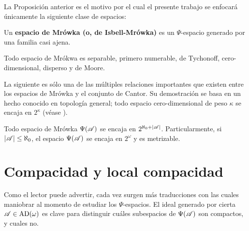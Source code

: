 La Proposición anterior es el motivo por el cual el presente trabajo se enfocará únicamente la siguiente clase de espacios:

\begin{definicion}
	Un \textbf{espacio de Mrówka (o, de Isbell-Mrówka)} es un $\Psi$-espacio generado por una familia casi ajena.
\end{definicion}

\begin{corolario}\label{cor-MrwokaSiempre}
	Todo espacio de Mrókwa es separable, primero numerable, de Tychonoff, cero-dimensional, disperso y de Moore.
\end{corolario}

La siguiente es sólo una de las múltiples relaciones importantes que existen entre los espacios de Mrówka y el conjunto de Cantor. Su demostración se basa en un hecho conocido en topología general; todo espacio cero-dimensional de peso $\kappa$ se encaja en $2^\kappa$ (véase \cite[Teo.~8.5.11, p.~299]{fidelElementos}).

\begin{corolario}\label{cor-EncajeMrowkaCantor}
	Todo espacio de Mrówka $\Psi(\mathscr{A})$ se encaja en $2^{\aleph_0+|\mathscr{A}|}$. Particularmente, si $|\mathscr{A}|\leq \aleph_0$, el espacio $\Psi(\mathscr{A})$ se encaja en $2^\omega$ y es metrizable.
\end{corolario}

\section{Compacidad y local compacidad}

Como el lector puede advertir, cada vez surgen más traducciones con las cuales maniobrar al momento de estudiar los $\Psi$-espacios. El ideal generado por cierta $\mathscr{A} \in \operatorname{AD}(\omega)$ es clave para distinguir cuáles subespacios de $\Psi(\mathscr{A})$ son compactos, y cuales no.

